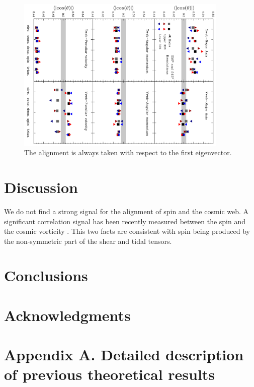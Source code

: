 \documentclass[usenatbib]{mn2e}
\begin{document}
\begin{figure}
\includegraphics[width=0.90\textwidth,angle=90]{all_cuts.pdf}
\caption{The alignment is always taken with respect to the first eigenvector.}
\end{figure}
\section{Discussion}
\label{sec:discussion}


We do not find a strong signal for the alignment of spin and the
cosmic web. A significant correlation signal has been recently
measured between the spin and the cosmic vorticity
\citep{Libeskind2013a,Laigle2013}. This two facts are consistent with
spin being produced by the non-symmetric part of the shear and tidal
tensors.  

\section{Conclusions}
\label{sec:conclusions}


\section*{Acknowledgments} 

\section*{Appendix A. Detailed description of previous theoretical results}
\end{document}
